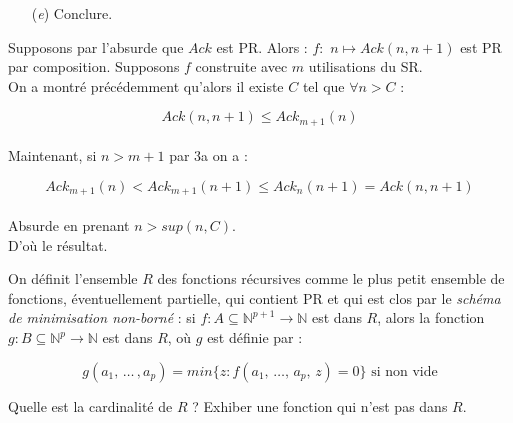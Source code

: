 \documentclass[12pt,letterpaper,boxed]{hmcpset}
\begin{document}
\begin{solution}
\begin{problem}
\begin{itemize}  
  \item[(\textit{e})]  Conclure. \end{itemize}
 \end{problem}
 
  \begin{solution}[(e)]
  Supposons par l'absurde que $Ack$ est PR. Alors : $f: \, \, n \mapsto Ack(n,n+1)$ est PR par composition. Supposons $f$ construite avec $m$ utilisations du SR.\\
   On a montré précédemment qu'alors il existe $C$ tel que $\forall n > C$ :
   
   $$ Ack(n,n+1) \leq Ack_{m+1}(n) $$
   \ \\
   
  \noindent Maintenant, si $n > m+1$ par 3a on a :
   
   $$ Ack_{m+1}(n) < Ack_{m+1}(n+1) \leq Ack_{n}(n+1) = Ack(n,n+1) $$ 
   \ \\
   \noindent Absurde en prenant $n > sup(n,C)$.
   \\
   D'où le résultat.
   \end{solution}

\end{solution}

 \newpage
\begin{problem}[Question 4]

On définit l'ensemble $R$ des fonctions récursives comme le plus petit ensemble de fonctions, éventuellement partielle, qui contient PR et qui est clos par le \textit{schéma de minimisation non-borné} : si $f : A \subseteq \mathbb{N}^{p+1} \to \mathbb{N}$ est dans $R$, alors la fonction $g : B \subseteq \mathbb{N}^{p} \to \mathbb{N}$ est dans $R$, où $g$ est définie par :

$$ g(a_{1}, \, \dots \,, a_{p}) = min \{ z : f(a_{1}, \, \dots , \, a_{p} , \, z) = 0 \} \text{ si non vide}$$
 
Quelle est la cardinalité de $R$ ? Exhiber une fonction qui n'est pas dans $R$.

\end{problem}
\end{document}

